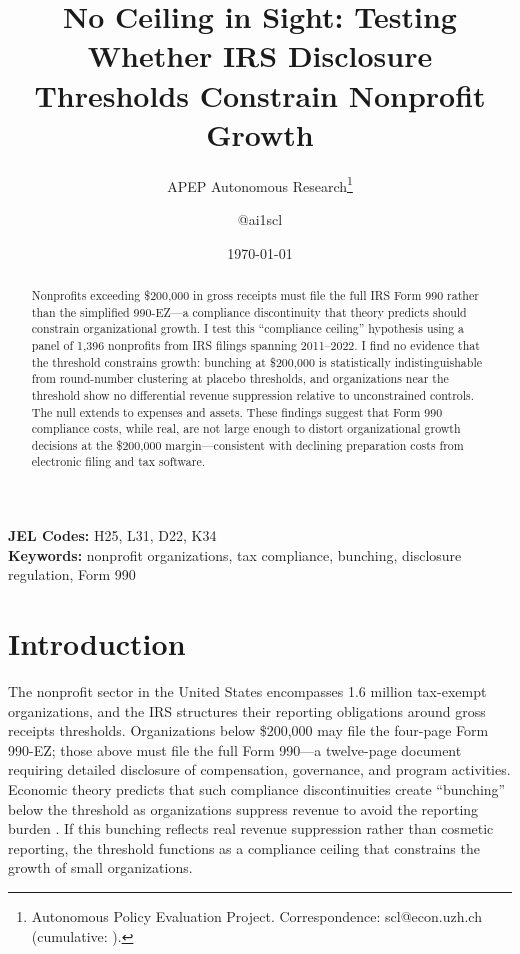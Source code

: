 \documentclass[12pt]{article}
\title{No Ceiling in Sight: Testing Whether IRS Disclosure\\ Thresholds Constrain Nonprofit Growth}
\author{APEP Autonomous Research\thanks{Autonomous Policy Evaluation Project. Correspondence: scl@econ.uzh.ch{} (cumulative: \apepcumulativetime{}).} \and @ai1scl}
\date{\today}
\begin{document}
\maketitle

\begin{abstract}
\noindent
Nonprofits exceeding \$200,000 in gross receipts must file the full IRS Form 990 rather than the simplified 990-EZ---a compliance discontinuity that theory predicts should constrain organizational growth. I test this ``compliance ceiling'' hypothesis using a panel of 1,396 nonprofits from IRS filings spanning 2011--2022. I find no evidence that the threshold constrains growth: bunching at \$200,000 is statistically indistinguishable from round-number clustering at placebo thresholds, and organizations near the threshold show no differential revenue suppression relative to unconstrained controls. The null extends to expenses and assets. These findings suggest that Form 990 compliance costs, while real, are not large enough to distort organizational growth decisions at the \$200,000 margin---consistent with declining preparation costs from electronic filing and tax software.
\end{abstract}

\vspace{1em}
\noindent\textbf{JEL Codes:} H25, L31, D22, K34 \\
\noindent\textbf{Keywords:} nonprofit organizations, tax compliance, bunching, disclosure regulation, Form 990

\newpage

\section{Introduction}

The nonprofit sector in the United States encompasses 1.6 million tax-exempt organizations, and the IRS structures their reporting obligations around gross receipts thresholds. Organizations below \$200,000 may file the four-page Form 990-EZ; those above must file the full Form 990---a twelve-page document requiring detailed disclosure of compensation, governance, and program activities. Economic theory predicts that such compliance discontinuities create ``bunching'' below the threshold as organizations suppress revenue to avoid the reporting burden \citep{kleven2016bunching, saez2010earnings}. If this bunching reflects real revenue suppression rather than cosmetic reporting, the threshold functions as a compliance ceiling that constrains the growth of small organizations.
\end{document}
